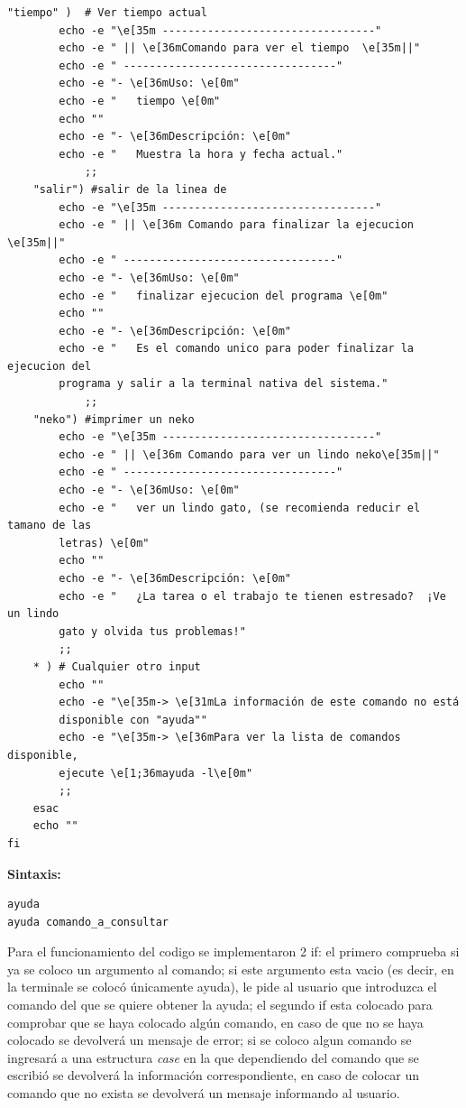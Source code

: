 \documentclass[12pt,a4paper]{article}
\begin{document}
\begin{lstlisting}[style=BashInputStyle]
    "tiempo" )  # Ver tiempo actual
        echo -e "\e[35m ---------------------------------"
        echo -e " || \e[36mComando para ver el tiempo  \e[35m||"
        echo -e " ---------------------------------"
        echo -e "- \e[36mUso: \e[0m"
        echo -e "   tiempo \e[0m"
        echo ""
        echo -e "- \e[36mDescripción: \e[0m"
        echo -e "   Muestra la hora y fecha actual."
            ;;
    "salir") #salir de la linea de 
        echo -e "\e[35m ---------------------------------"
        echo -e " || \e[36m Comando para finalizar la ejecucion \e[35m||"
        echo -e " ---------------------------------"
        echo -e "- \e[36mUso: \e[0m"
        echo -e "   finalizar ejecucion del programa \e[0m"
        echo ""
        echo -e "- \e[36mDescripción: \e[0m"
        echo -e "   Es el comando unico para poder finalizar la ejecucion del
        programa y salir a la terminal nativa del sistema."
            ;;
    "neko") #imprimer un neko
        echo -e "\e[35m ---------------------------------"
        echo -e " || \e[36m Comando para ver un lindo neko\e[35m||"
        echo -e " ---------------------------------"
        echo -e "- \e[36mUso: \e[0m"
        echo -e "   ver un lindo gato, (se recomienda reducir el tamano de las
        letras) \e[0m"
        echo ""
        echo -e "- \e[36mDescripción: \e[0m"
        echo -e "   ¿La tarea o el trabajo te tienen estresado?  ¡Ve un lindo
        gato y olvida tus problemas!"
        ;;
    * ) # Cualquier otro input
        echo ""
        echo -e "\e[35m-> \e[31mLa información de este comando no está 
        disponible con "ayuda""
        echo -e "\e[35m-> \e[36mPara ver la lista de comandos disponible,
        ejecute \e[1;36mayuda -l\e[0m"
        ;;
    esac
    echo ""
fi
    \end{lstlisting} 
    \textbf{Sintaxis:}
    \begin{lstlisting}[style=BashInputStyle]
ayuda
ayuda comando_a_consultar
    \end{lstlisting} 
    \justifying
    \noindent
Para el funcionamiento del codigo se implementaron 2 if: el primero comprueba si ya se coloco un argumento al comando; si este argumento esta vacio  (es decir, en la terminale se colocó únicamente ayuda), le pide al usuario que introduzca el comando del que se quiere obtener la ayuda; el segundo if esta colocado para comprobar que se haya colocado algún comando, en caso de que no se haya colocado se devolverá un mensaje de error; si se coloco algun comando se ingresará a una estructura \textit{case} en la que dependiendo del comando que se escribió se devolverá la información correspondiente, en caso de colocar un comando que no exista se devolverá un mensaje informando al usuario.
\justifying
\newpage
\end{document}
